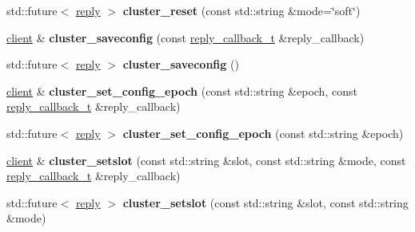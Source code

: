 \begin{DoxyCompactItemize}
\item 
\mbox{\label{classcpp__redis_1_1client_ac49706b4ea17538653a6e5a77791ae31}} 
std\+::future$<$ \hyperlink{classcpp__redis_1_1reply}{reply} $>$ {\bfseries cluster\+\_\+reset} (const std\+::string \&mode=\char`\"{}soft\char`\"{})
\item 
\mbox{\label{classcpp__redis_1_1client_a2860dbeb1f7acd44e72e3ad02fc16e20}} 
\hyperlink{classcpp__redis_1_1client}{client} \& {\bfseries cluster\+\_\+saveconfig} (const \hyperlink{classcpp__redis_1_1client_a061a1140d36d2eaeda82b09a0bb3f9f2}{reply\+\_\+callback\+\_\+t} \&reply\+\_\+callback)
\item 
\mbox{\label{classcpp__redis_1_1client_a5b8571b48e9e56fad203a04dd50559be}} 
std\+::future$<$ \hyperlink{classcpp__redis_1_1reply}{reply} $>$ {\bfseries cluster\+\_\+saveconfig} ()
\item 
\mbox{\label{classcpp__redis_1_1client_ac930f6544459b0b2476f741beb6a2508}} 
\hyperlink{classcpp__redis_1_1client}{client} \& {\bfseries cluster\+\_\+set\+\_\+config\+\_\+epoch} (const std\+::string \&epoch, const \hyperlink{classcpp__redis_1_1client_a061a1140d36d2eaeda82b09a0bb3f9f2}{reply\+\_\+callback\+\_\+t} \&reply\+\_\+callback)
\item 
\mbox{\label{classcpp__redis_1_1client_a0be11e04ce58a13e2e40272be1fad788}} 
std\+::future$<$ \hyperlink{classcpp__redis_1_1reply}{reply} $>$ {\bfseries cluster\+\_\+set\+\_\+config\+\_\+epoch} (const std\+::string \&epoch)
\item 
\mbox{\label{classcpp__redis_1_1client_aeba14289869fe871eb9eb9c2503635a8}} 
\hyperlink{classcpp__redis_1_1client}{client} \& {\bfseries cluster\+\_\+setslot} (const std\+::string \&slot, const std\+::string \&mode, const \hyperlink{classcpp__redis_1_1client_a061a1140d36d2eaeda82b09a0bb3f9f2}{reply\+\_\+callback\+\_\+t} \&reply\+\_\+callback)
\item 
\mbox{\label{classcpp__redis_1_1client_ad9b75e2c90b1b87fa93a3ac76bd1512f}} 
std\+::future$<$ \hyperlink{classcpp__redis_1_1reply}{reply} $>$ {\bfseries cluster\+\_\+setslot} (const std\+::string \&slot, const std\+::string \&mode)

\end{DoxyCompactItemize}
